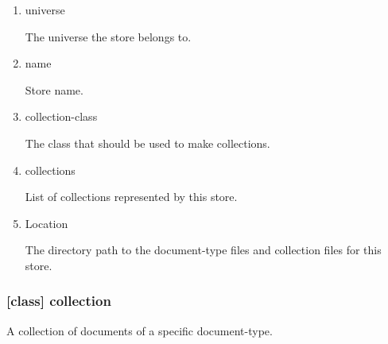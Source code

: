 \documentclass[11pt]{article}
\begin{document}
\begin{enumerate}
\item\relax [accessor] universe
\label{sec:org639c03d}

The universe the store belongs to.

\item\relax [accessor] name
\label{sec:org0ee63b8}

Store name.

\item\relax [accessor] collection-class
\label{sec:orgea4d968}

The class that should be used to make collections.

\item\relax [accessor] collections
\label{sec:orgf3f7c50}

List of collections represented by this store.

\item\relax [accessor] Location
\label{sec:org08be04e}

The directory path to the document-type files and collection files for
this store.
\end{enumerate}

\subsubsection{[class] collection}
\label{sec:org7884372}

A collection of documents of a specific document-type.
\end{document}
